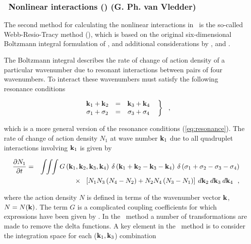 \vsssub
\subsubsection{~Nonlinear interactions (\xnl) \hfill {\rm (G. Ph. van Vledder)}} \label{sec_xnl}
\vsssub

The second method for calculating the nonlinear interactions in \ws\ is the
so-called Webb-Resio-Tracy method (\xnl), which is based on the original
six-dimensional Boltzmann integral formulation of
\cite{art:Has62,art:Has63a,art:Has63b}, and additional considerations by
\cite{art:Web78}, \cite{rep:TR82} and \cite{art:RP91}.

The Boltzmann integral describes the rate of change of action density of a
particular wavenumber due to resonant interactions between pairs of four
wavenumbers. To interact these wavenumbers must satisfy the following
resonance conditions


\begin{equation} \left .
\begin{array}{ccc}
  \mbox{\bf k}_1 + \mbox{\bf k}_2 & = & \mbox{\bf k}_3 + \mbox{\bf k}_4          \\
  \sigma_1 + \sigma_2  & = & \sigma_3 + \sigma_4
\end{array} \:\:\: \right \rbrace \:\:\: , \label{eq:resonance_2}
\end{equation}

\noindent
which is a more general version of the resonance conditions
(\ref{eq:resonance}). The rate of change of action density $N_1 $ at
wave number $\mbox{\bf k}_1$ due to all quadruplet interactions involving
$\mbox{\bf k}_1$ is given by

\begin{eqnarray}
\frac{{\partial N_1 }}{{\partial t}} & = & \int\!\!\int\!\!\int G\left( \mbox{\bf k}_1
,\mbox{\bf k}_2 ,\mbox{\bf k}_3 ,\mbox{\bf k}_4 \right ) \: \delta \left( \mbox{\bf k}_1  + \mbox{\bf k}_2  - \mbox{\bf k}_3
- \mbox{\bf k}_4 \right)
\: \delta \left( {\sigma _1  + \sigma _2  - \sigma _3  - \sigma _4 }
\right) \nonumber \\  & &
\hspace{7mm}\times \:\:\: \left[ {N_1 N_3 \left( {N_4  - N_2 } \right)
+ N_2 N_4 \left(
{N_3  - N_1 } \right)} \right] \: d\mbox{\bf k}_2 \: d\mbox{\bf k}_3 \: d\mbox{\bf k}_4 \:\:\: ,
\end{eqnarray}

\noindent
where the action density $N$ is defined in terms of the wavenumber
vector $\mbox{\bf k}$, $N = N(\mbox{\bf k})$. The term $G$ is a complicated coupling
coefficients for which expressions have been given by \cite{art:HH80}.
In the \xnl\ method a number of transformations are
made to remove the delta functions. A key element in the \xnl\ method
is to consider the integration space for each ($\mbox{\bf k}_1 ,\mbox{\bf k}_3 $)
combination \citep[see][]{art:RP91}

